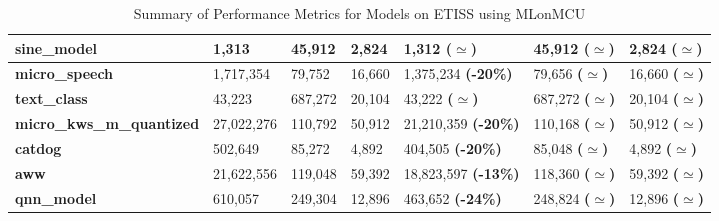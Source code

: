 \begin{table}[!ht]
\begin{tabular}{|l|l|l|l|l|l|l|}
        \cline{2-7}
        \hline
        {\textbf{sine\_model}} & 1,313 & 45,912 & 2,824 & 1,312 \textbf{($\simeq$)} & 45,912 \textbf{($\simeq$)} & 2,824 \textbf{($\simeq$)} \\
        \cline{2-7}
        \hline
        {\textbf{micro\_speech}} & 1,717,354 & 79,752 & 16,660 & 1,375,234 \textbf{(-20\%)} & 79,656 \textbf{($\simeq$)} & 16,660 \textbf{($\simeq$)} \\
        \cline{2-7}
        \hline
        {\textbf{text\_class}} & 43,223 & 687,272 & 20,104 & 43,222 \textbf{($\simeq$)} & 687,272 \textbf{($\simeq$)} & 20,104 \textbf{($\simeq$)} \\
        \cline{2-7}
        \hline
        {\textbf{micro\_kws\_m\_quantized}} & 27,022,276 & 110,792 & 50,912 & 21,210,359 \textbf{(-20\%)} & 110,168 \textbf{($\simeq$)} & 50,912 \textbf{($\simeq$)} \\
        \cline{2-7}
        \hline
        {\textbf{catdog}} & 502,649 & 85,272 & 4,892 & 404,505 \textbf{(-20\%)} & 85,048 \textbf{($\simeq$)} & 4,892 \textbf{($\simeq$)} \\
        \cline{2-7}
        \hline
        {\textbf{aww}} & 21,622,556 & 119,048 & 59,392 & 18,823,597 \textbf{(-13\%)} & 118,360 \textbf{($\simeq$)} & 59,392 \textbf{($\simeq$)} \\
        \cline{2-7}
        \hline
        {\textbf{qnn\_model}} & 610,057 & 249,304 & 12,896 & 463,652 \textbf{(-24\%)} & 248,824 \textbf{($\simeq$)} & 12,896 \textbf{($\simeq$)} \\
        \cline{2-7}

    \end{tabular}
    \caption{Summary of Performance Metrics for Models on ETISS using MLonMCU}
    \label{tab:performance_metrics}
\end{table}

